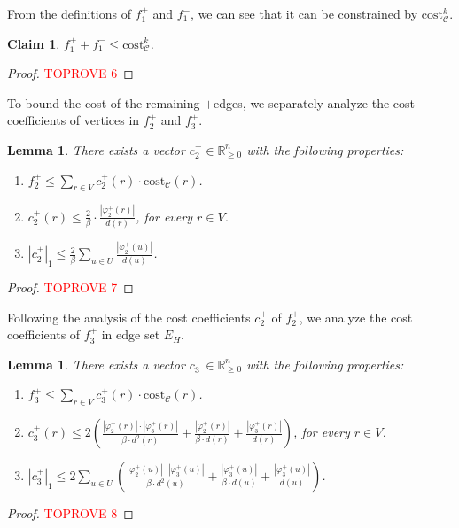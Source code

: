 \documentclass[11pt]{article}
\newcommand{\R}{\mathbb{R}}
\newcommand{\cost}{\mathrm{cost}}
\newtheorem{lemma}[theorem]{Lemma}
\newtheorem{claim}[theorem]{Claim}
\newcommand{\calC}{{\mathcal{C}}}
\begin{document}
\begin{CJK*}{UTF8}{gbsn}
From the definitions of $f^+_1$ and $f^-_1$, we can see that it can be constrained by $\cost^k_\calC$.

 \begin{claim}
    $f^+_1 + f^-_1 \leq \cost^k_\calC$. 
 \end{claim}
 \begin{proof}\textcolor{red}{TOPROVE 6}\end{proof}

To bound the cost of the remaining $+$edges, we separately analyze the cost coefficients of vertices in $f^+_2$ and $f^+_3$. 

\begin{lemma}
    \label{lemma:f+2}
    There exists a vector $c^+_2 \in \R_{\geq 0}^{n}$ with the following properties:
    \begin{enumerate}[label=(\ref{lemma:f+2}\alph*)]
        \item \label{property:f+2-cost} $f^+_2 \leq \sum_{r \in V}c^+_2(r)\cdot \cost_\calC(r)$.
        \item \label{property:f+2-c+2-infty} $c^+_2(r) \leq \frac{2}{\beta} \cdot \frac{|\varphi^+_2(r)|}{d(r)}$, for every $r \in V$.
        \item \label{property:f+2-c+2-1} $|c^+_2|_1 \leq \frac2\beta\sum_{u \in U}\frac{|\varphi^+_2(u)|}{d(u)}$.
    \end{enumerate}
\end{lemma}
\begin{proof}\textcolor{red}{TOPROVE 7}\end{proof}

Following the analysis of the cost coefficients $c^+_2$ of $f^+_2$, we analyze the cost coefficients of $f^+_3$ in edge set $E_H$.

\begin{lemma}
    \label{lemma:f+3}
    There exists a vector $c^+_3 \in \R_{\geq 0}^{n}$ with the following properties:
    \begin{enumerate}[label=(\ref{lemma:f+3}\alph*)]
        \item \label{property:f+3-cost} $f^+_3 \leq \sum_{r \in V}c^+_3(r)\cdot \cost_\calC(r)$.
        \item \label{property:f+3-c+3-infty} $c^+_3(r) \leq 2\left(\frac{|\varphi^+_2(r)|\cdot |\varphi^+_3(r)|}{\beta\cdot d^2(r)}  + \frac{|\varphi^+_2(r)|}{\beta\cdot d(r)} + \frac{|\varphi^+_3(r)|}{d(r)}\right)$, for every $r \in V$.
        \item \label{property:f+3-c+3-1} $|c^+_3|_1 \leq 2 \sum_{u \in U} \left(\frac{|\varphi^+_2(u)|\cdot|\varphi^+_3(u)|}{\beta \cdot d^2(u)} + \frac{|\varphi^+_3(u)|}{\beta \cdot d(u)} + \frac{|\varphi^+_3(u)|}{d(u)}\right)$.
    \end{enumerate}
\end{lemma}
\begin{proof}\textcolor{red}{TOPROVE 8}\end{proof}


\end{CJK*}
\end{document}
